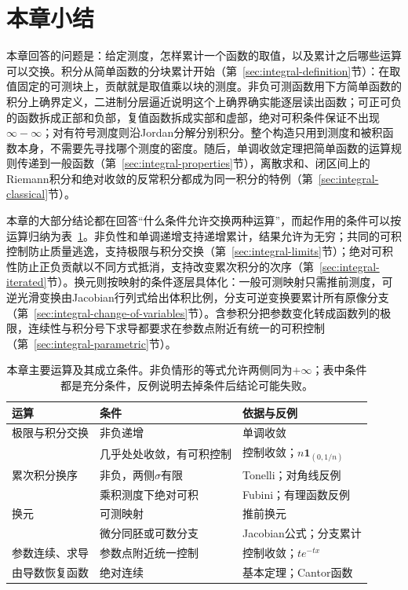 \section{本章小结}
\label{sec:integral-summary}

本章回答的问题是：给定测度，怎样累计一个函数的取值，以及累计之后哪些运算可以交换。积分从简单函数的分块累计开始（第~\ref{sec:integral-definition}节）：在取值固定的可测块上，贡献就是取值乘以块的测度。非负可测函数用下方简单函数的积分上确界定义，二进制分层逼近说明这个上确界确实能逐层读出函数；可正可负的函数拆成正部和负部，复值函数拆成实部和虚部，绝对可积条件保证不出现$\infty-\infty$；对有符号测度则沿Jordan分解分别积分。整个构造只用到测度和被积函数本身，不需要先寻找哪个测度的密度。随后，单调收敛定理把简单函数的运算规则传递到一般函数（第~\ref{sec:integral-properties}节），离散求和、闭区间上的Riemann积分和绝对收敛的反常积分都成为同一积分的特例（第~\ref{sec:integral-classical}节）。

本章的大部分结论都在回答“什么条件允许交换两种运算”，而起作用的条件可以按运算归纳为表~\ref{tab:integral-summary-conditions}。非负性和单调递增支持递增累计，结果允许为无穷；共同的可积控制防止质量逃逸，支持极限与积分交换（第~\ref{sec:integral-limits}节）；绝对可积性防止正负贡献以不同方式抵消，支持改变累次积分的次序（第~\ref{sec:integral-iterated}节）。换元则按映射的条件逐层具体化：一般可测映射只需推前测度，可逆光滑变换由Jacobian行列式给出体积比例，分支可逆变换要累计所有原像分支（第~\ref{sec:integral-change-of-variables}节）。含参积分把参数变化转成函数列的极限，连续性与积分号下求导都要求在参数点附近有统一的可积控制（第~\ref{sec:integral-parametric}节）。

\begin{table}[!htbp]
\centering
\caption{本章主要运算及其成立条件。非负情形的等式允许两侧同为$+\infty$；表中条件都是充分条件，反例说明去掉条件后结论可能失败。}
\label{tab:integral-summary-conditions}
\small
\begin{tabularx}{\linewidth}{@{}l>{\RaggedRight\arraybackslash}X>{\RaggedRight\arraybackslash}X@{}}
\toprule
运算 & 条件 & 依据与反例\\
\midrule
极限与积分交换 & 非负递增 & 单调收敛\\
 & 几乎处处收敛，有可积控制 & 控制收敛；$n\mathbf 1_{(0,1/n)}$\\
累次积分换序 & 非负，两侧$\sigma$有限 & Tonelli；对角线反例\\
 & 乘积测度下绝对可积 & Fubini；有理函数反例\\
换元 & 可测映射 & 推前换元\\
 & 微分同胚或可数分支 & Jacobian公式；分支累计\\
参数连续、求导 & 参数点附近统一控制 & 控制收敛；$te^{-tx}$\\
由导数恢复函数 & 绝对连续 & 基本定理；Cantor函数\\
\bottomrule
\end{tabularx}
\end{table}

